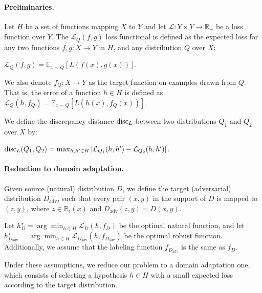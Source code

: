 \paragraph{Preliminaries.}
Let $H$ be a set of functions mapping $X$ to $Y$ and let $\mathcal{L}:Y \times Y\rightarrow\mathbb{R}_+$ be a loss function over $Y$.
The $\mathcal{L}_Q(f, g)$ loss functional is defined as the expected loss for any
two functions $f,g : X \rightarrow Y$ in $H$, and any distribution $Q$ over $X$:
\begin{center} 
$\mathcal{L}_Q(f,g) = \mathbb{E}_{x \sim Q}[L(f(x),g(x))]$.
\end{center}

We also denote $f_Q: X \rightarrow Y$ as the 
target function on examples drawn from $Q$. 
That is, the error of a function $h\in H$ is defined as 
$\mathcal{L}_Q(h,f_Q) = \mathbb{E}_{x \sim Q}[L(h(x),f_Q(x))]$.


We define the  discrepancy distance $\operatorname{disc}_L$ between
two distributions $Q_1$ and $Q_2$ over $X$ by:
\begin{center} 
$\operatorname{disc}_L(Q_1,Q_2)=\max_{h,h'\in H} |\mathcal{L}_{Q_1}(h,h')-\mathcal{L}_{Q_2}(h,h')|$.
\end{center}

\paragraph{Reduction to domain adaptation.} Given source (natural) distribution $D$, we define the target (adversarial) distribution $D_{\text{adv}}$, such that every pair $(x,y)$ in the support of $D$ is mapped to $(z,y)$, where $z\in \mathbb{B}_{\epsilon}(x)$ and $D_{\text{adv}}(z,y)=D(x,y)$.

Let $h_{D}^{\star}=\arg \min_{h\in H}\mathcal{L}_D(h,f_{D})$ be the optimal natural function, and let $h_{D_{\text{adv}}}^{\star}=\arg \min_{h\in H}\mathcal{L}_{D_{\text{adv}}}(h,f_{D_{\text{adv}}})$ be the optimal robust function.
Additionally, we assume that the labeling function $f_{D_{\text{adv}}}$ is the same as $f_D$.

Under these assumptions, we reduce our problem to a domain adaptation one, which consists of selecting a hypothesis $h \in H$ with a small expected
loss according to the target distribution.

